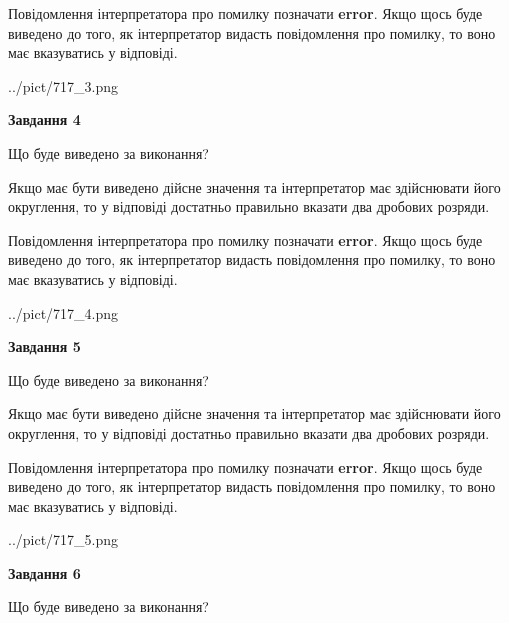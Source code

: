 \documentclass[12pt, ukrainian]{article}
\begin{document}
{\begin {Large}
Повідомлення інтерпретатора про помилку позначати \textbf{error}.
Якщо щось буде виведено до того, як інтерпретатор видасть повідомлення про помилку, 
то воно має вказуватись у відповіді. \par

\begin{center}
	{../pict/717_3.png}
\end{center}
\newpage

{\begin {center}\textbf{Завдання 4}\end {center}}\par
Що буде виведено за виконання? \par

Якщо має бути виведено дійсне значення та інтерпретатор має здійснювати його округлення, 
то у відповіді достатньо правильно вказати два дробових розряди.

Повідомлення інтерпретатора про помилку позначати \textbf{error}.
Якщо щось буде виведено до того, як інтерпретатор видасть повідомлення про помилку, 
то воно має вказуватись у відповіді. \par

\begin{center}
	{../pict/717_4.png}
\end{center}
\newpage

{\begin {center}\textbf{Завдання 5}\end {center}}\par
Що буде виведено за виконання? \par

Якщо має бути виведено дійсне значення та інтерпретатор має здійснювати його округлення, 
то у відповіді достатньо правильно вказати два дробових розряди.

Повідомлення інтерпретатора про помилку позначати \textbf{error}.
Якщо щось буде виведено до того, як інтерпретатор видасть повідомлення про помилку, 
то воно має вказуватись у відповіді. \par

\begin{center}
	{../pict/717_5.png}
\end{center}
\newpage

{\begin {center}\textbf{Завдання 6}\end {center}}\par
Що буде виведено за виконання? \par


\end{Large}}
\end{document}
